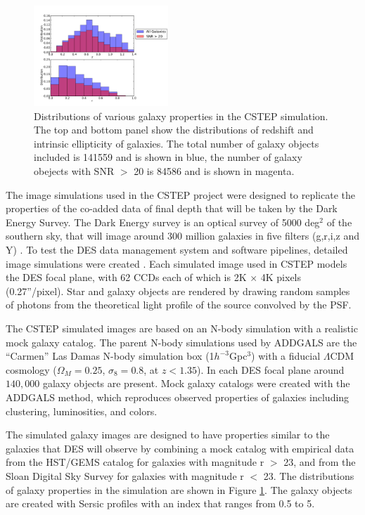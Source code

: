 \begin{figure}
 \centering  %
  \includegraphics[width=0.45\textwidth]{fig/Out_hist_v2_truth.pdf} 
  \caption{Distributions of various galaxy 
properties in the CSTEP simulation. The top and bottom panel show the
distributions of redshift and intrinsic ellipticity of galaxies. The
total number of galaxy objects included is 141559 and is shown in blue, the number of
galaxy obejects with SNR $>$ 20 is 84586 and is shown in magenta. }
\label{fig:Galprop}
\end{figure}

The image simulations used in the CSTEP project were designed to 
replicate the properties of the co-added data of final depth that will be taken by the 
Dark Energy Survey. The Dark Energy survey is an optical survey of
5000 deg$^2$ of the southern sky, that will image around 300 million
galaxies in five filters (g,r,i,z and Y) \citep{Klaus}. To test the DES
data management system and software pipelines, detailed image simulations were created \citep{DESsim}. Each simulated image used in CSTEP models the DES focal plane,
with 62 CCDs each of which is 2K $\times$ 4K pixels (0.27''/pixel). Star and galaxy objects are
rendered by drawing random samples of
photons from the theoretical light profile of the source convolved 
by the PSF.

The CSTEP simulated images are based on an N-body simulation with a realistic mock galaxy catalog.
The parent N-body simulations used by ADDGALS are the ``Carmen'' Las Damas \citep{LasDamas}
N-body simulation box (1$h^{-3}$Gpc$^3$) with a fiducial $\Lambda$CDM cosmology ($\Omega_M=0.25$, $\sigma_8 = 0.8$, at $z< 1.35$). In each DES focal plane around $140,000$ galaxy objects are
present. Mock galaxy catalogs were
created with the ADDGALS  method, which reproduces observed properties
of galaxies including clustering, luminosities, and colors. 

The simulated galaxy images are designed to have properties similar to
the galaxies that DES will observe by combining a mock
catalog with empirical data from the HST/GEMS catalog for galaxies
with magnitude r $ > $ 23, and from the Sloan Digital Sky Survey for
galaxies with magnitude r $ < $ 23. The distributions of galaxy
properties in the simulation are shown in Figure \ref{fig:Galprop}. 
The galaxy objects are created with Sersic profiles with an
index that ranges from 0.5 to 5.

